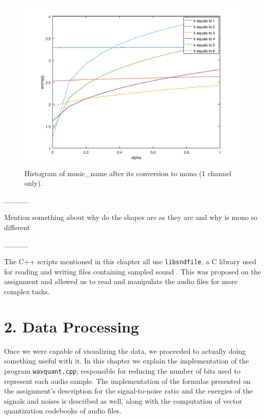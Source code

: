 \documentclass[12pt]{article}
\begin{document}
\begin{figure}[H]
  \centering
  \begin{minipage}{.5\textwidth}
    \centering
    \includegraphics[width=\linewidth]{bible_en.png}
  \end{minipage}%
  \caption{{Histogram of music\_name after its conversion to mono (1 channel only).}}
  \label{fig:histogram_mono}
\end{figure}

............

Mention something about why do the shapes are as they are and why is mono so different

............

The C++ scripts mentioned in this chapter all use \texttt{libsndfile}, a C 
library used for reading and writing files containing sampled sound \cite{libsndfile}.
This was proposed on the assignment and allowed us to read and manipulate the 
audio files for more complex tasks.

\newpage
\section*{2. Data Processing}

Once we were capable of visualizing the data, we proceeded to actually doing 
something useful with it.
In this chapter we explain the implementation of the program \texttt{wavquant.cpp},
responsible for reducing the number of bits used to represent each audio sample.
The implementation of the formulas presented on the assignment's description for
the signal-to-noise ratio and the energies of the signals and noises is described
as well, along with the computation of vector quantization codebooks of audio files.
\end{document}
